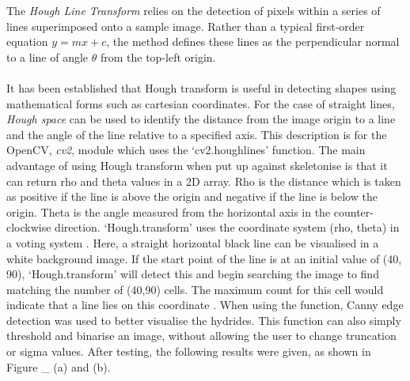 \documentclass{article}
\begin{document}
	The \textit{Hough Line Transform} relies on the detection of pixels within a series of lines superimposed onto a sample image. Rather than a typical first-order equation $y=mx+c$, the method defines these lines as the perpendicular normal to a line of angle $\theta$ from the top-left origin.
	\\
	\\	
	It has been established that Hough transform is useful in detecting shapes using mathematical forms such as cartesian coordinates. For the case of straight lines, \textit{Hough space} can be used to identify the distance from the image origin to a line and the angle of the line relative to a specified axis. This description is for the OpenCV, \textit{cv2}, module which uses the ‘cv2.houghlines’ function. The main advantage of using Hough transform when put up against skeletonise is that it can return rho and theta values in a 2D array. Rho is the distance which is taken as positive if the line is above the origin and negative if the line is below the origin. Theta is the angle measured from the horizontal axis in the counter-clockwise direction. ‘Hough.transform’ uses the coordinate system (rho, theta) in a voting system \cite{OpenCV2013}. Here, a straight horizontal black line can be visualised in a white background image. If the start point of the line is at an initial value of (40, 90), ‘Hough.transform’ will detect this and begin searching the image to find matching the number of (40,90) cells. The maximum count for this cell would indicate that a line lies on this coordinate \cite{OpenCV2013}. When using the function, Canny edge detection was used to better visualise the hydrides. This function can also simply threshold and binarise an image, without allowing the user to change truncation or sigma values. After testing, the following results were given, as shown in Figure \_ (a) and (b). 
	\\	
\end{document}
